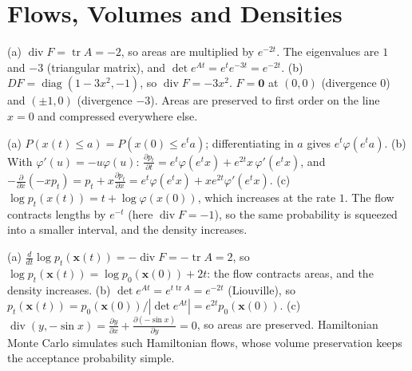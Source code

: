 \documentclass[11pt]{article}
\DeclareMathOperator{\tr}{tr}
\DeclareMathOperator{\diag}{diag}
\DeclareMathOperator{\Div}{div}
\begin{document}
\section*{Flows, Volumes and Densities}

\begin{description}[leftmargin=0pt, itemsep=0.3em]
    \item[\ref{pr:volume-flow}.] (a) $\Div F = \tr A = -2$, so areas are multiplied by $e^{-2t}$. The eigenvalues are $1$ and $-3$ (triangular matrix), and $\det e^{At} = e^te^{-3t} = e^{-2t}$. (b) $DF = \diag(1 - 3x^2, -1)$, so $\Div F = -3x^2$. $F = \mathbf{0}$ at $(0, 0)$ (divergence $0$) and $(\pm 1, 0)$ (divergence $-3$). Areas are preserved to first order on the line $x = 0$ and compressed everywhere else.
    \item[\ref{pr:continuity-1d}.] (a) $P(x(t) \leq a) = P(x(0) \leq e^ta)$; differentiating in $a$ gives $e^t\varphi(e^ta)$. (b) With $\varphi'(u) = -u\varphi(u)$: $\frac{\partial p_t}{\partial t} = e^t\varphi(e^tx) + e^{2t}x\,\varphi'(e^tx)$, and $-\frac{\partial}{\partial x}(-xp_t) = p_t + x\frac{\partial p_t}{\partial x} = e^t\varphi(e^tx) + xe^{2t}\varphi'(e^tx)$. (c) $\log p_t(x(t)) = t + \log\varphi(x(0))$, which increases at the rate $1$. The flow contracts lengths by $e^{-t}$ (here $\Div F = -1$), so the same probability is squeezed into a smaller interval, and the density increases.
    \item[\ref{pr:cnf-linear}.] (a) $\frac{d}{dt}\log p_t(\mathbf{x}(t)) = -\Div F = -\tr A = 2$, so $\log p_t(\mathbf{x}(t)) = \log p_0(\mathbf{x}(0)) + 2t$: the flow contracts areas, and the density increases. (b) $\det e^{At} = e^{t\tr A} = e^{-2t}$ (Liouville), so $p_t(\mathbf{x}(t)) = p_0(\mathbf{x}(0))/|\det e^{At}| = e^{2t}p_0(\mathbf{x}(0))$. (c) $\Div(y, -\sin x) = \frac{\partial y}{\partial x} + \frac{\partial(-\sin x)}{\partial y} = 0$, so areas are preserved. Hamiltonian Monte Carlo simulates such Hamiltonian flows, whose volume preservation keeps the acceptance probability simple.
\end{description}
\end{document}
